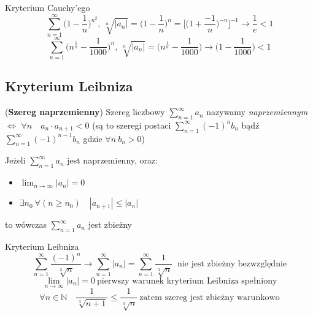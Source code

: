 \begin{przyk}{Kryterium Cauchy'ego}
$$\sum_{n=1}^{\infty} \bigg(1-\frac{1}{n} \bigg)^{n^2},\ \sqrt[n]{|a_n|}=\bigg(1-\frac{1}{n} \bigg)^n=\bigg[\bigg(1+\frac{-1}{n} \bigg)^{-n}\bigg]^{-1}\rightarrow\frac{1}{e}<1$$
$$\sum_{n=1}^{\infty} \bigg(n^{\frac{1}{n}}-\frac{1}{1000}\bigg)^n,\ \sqrt[n]{|a_n|}=\bigg(n^{\frac{1}{n}}-\frac{1}{1000}\bigg)\rightarrow \bigg(1-\frac{1}{1000}\bigg)<1$$
\end{przyk}

\subsection{Kryterium Leibniza}

\begin{df}{(\textbf{Szereg naprzemienny})}
Szereg liczbowy $\sum_{n=1}^{\infty}a_n$ nazywamy \textit{naprzemiennym} $\Leftrightarrow$ $\forall n\quad a_n\cdot a_{n+1}<0$ (są to szeregi postaci $\sum_{n=1}^{\infty}(-1)^n b_n$ bądź $\sum_{n=1}^{\infty}(-1)^{n-1} b_n$ gdzie $\forall n\ b_n>0$)

Jeżeli $\sum_{n=1}^{\infty}a_n$ jest naprzemienny, oraz:
\begin{itemize}
\item
$\lim_{n \to \infty}|a_n|=0$
\item
$\exists n_0\ \forall (n\geq n_0)\quad |a_{n+1}|\leq|a_n|$
\end{itemize}
to wówczas $\sum_{n=1}^{\infty}a_n$ jest zbieżny
\end{df}

\begin{przyk}{Kryterium Leibniza}
$$\sum_{n=1}^{\infty} \frac{(-1)^n}{\sqrt[3]{n}}\rightarrow \sum_{n=1}^{\infty}|a_{n}|=\sum_{n=1}^{\infty} \frac{1}{\sqrt[3]{n}}\ \text{ nie jest zbieżny bezwzględnie}$$
$$\lim_{n \to \infty}|a_n|=0\ \text{pierwszy warunek kryterium Leibniza spełniony}$$
$$\forall n\in\mathbb{N}\quad \frac{1}{\sqrt[3]{n+1}} \leq \frac{1}{\sqrt[3]{n}}\ \text{zatem szereg jest zbieżny warunkowo}$$
\end{przyk}